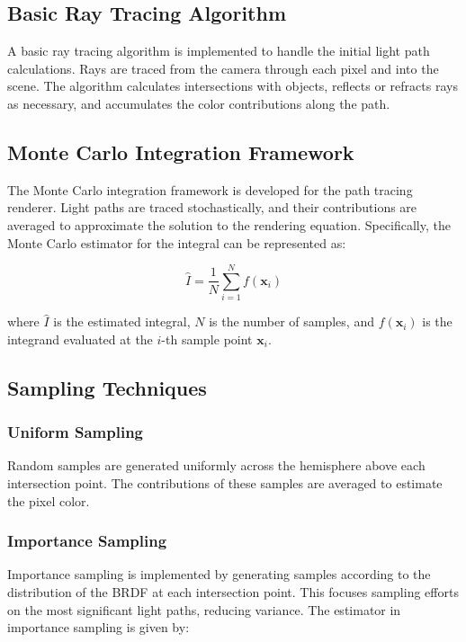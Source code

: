 \documentclass[12pt]{article}
\begin{document}
\subsection{Basic Ray Tracing Algorithm}
A basic ray tracing algorithm is implemented to handle the initial light path calculations. Rays are traced from the camera through each pixel and into the scene. The algorithm calculates intersections with objects, reflects or refracts rays as necessary, and accumulates the color contributions along the path.

\subsection{Monte Carlo Integration Framework}
The Monte Carlo integration framework is developed for the path tracing renderer. Light paths are traced stochastically, and their contributions are averaged to approximate the solution to the rendering equation. Specifically, the Monte Carlo estimator for the integral can be represented as:

\begin{equation}
    \hat{I} = \frac{1}{N} \sum_{i=1}^{N} f(\mathbf{x}_i)
\end{equation}

where $\hat{I}$ is the estimated integral, $N$ is the number of samples, and $f(\mathbf{x}_i)$ is the integrand evaluated at the $i$-th sample point $\mathbf{x}_i$.

\subsection{Sampling Techniques}
\subsubsection{Uniform Sampling}
Random samples are generated uniformly across the hemisphere above each intersection point. The contributions of these samples are averaged to estimate the pixel color.

\subsubsection{Importance Sampling}
Importance sampling is implemented by generating samples according to the distribution of the BRDF at each intersection point. This focuses sampling efforts on the most significant light paths, reducing variance. The estimator in importance sampling is given by:
\end{document}
